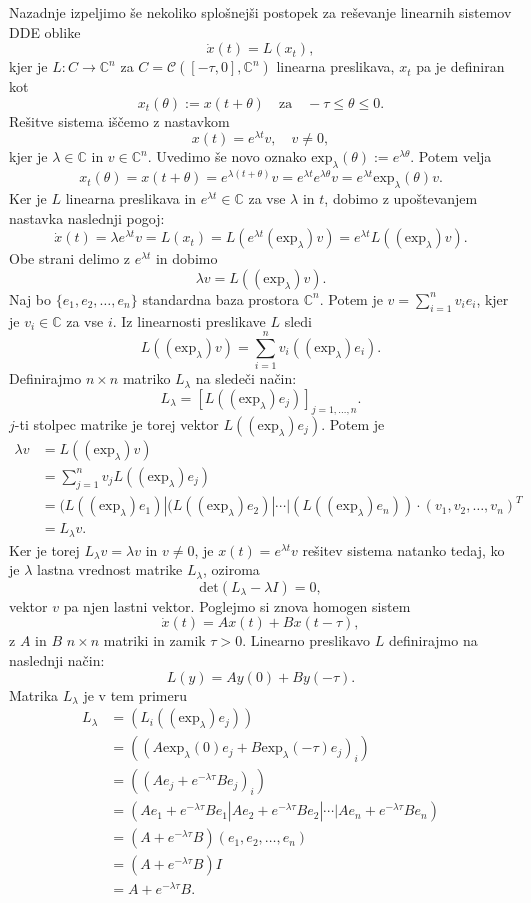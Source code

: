 \documentclass[12pt,a4paper]{amsart}
\theoremstyle{definition} %
\theoremstyle{plain} %
\newcommand{\C}{\mathbb C}
\newcommand{\okr}{\text{exp}_{\lambda}}
\begin{document}
Nazadnje izpeljimo še nekoliko splošnejši postopek za reševanje linearnih sistemov DDE oblike 
\[\dot{x}(t)=L(x_t),\]
kjer je $L:C\to\C^n$ za $C=\mathcal{C}([-\tau,0],\C^n)$ linearna preslikava, $x_t$ pa je definiran kot 
\[x_t(\theta):=x(t+\theta) \quad \text{za} \quad -\tau\leq\theta\leq0.\]
Rešitve sistema iščemo z nastavkom 
\[x(t)=e^{\lambda t}v, \quad v\neq0,\]
kjer je $\lambda\in\C$ in  $v\in\C^n$. Uvedimo še novo oznako $\text{exp}_{\lambda}(\theta):=e^{\lambda\theta}$.
Potem velja
\[x_t(\theta)=x(t+\theta)=e^{\lambda(t+\theta)}v=e^{\lambda t}e^{\lambda\theta}v=e^{\lambda t}\text{exp}_{\lambda}(\theta)v.\]
Ker je $L$ linearna preslikava in $e^{\lambda t}\in\C$ za vse $\lambda$ in $t$, dobimo z upoštevanjem nastavka naslednji
pogoj:
\[\dot{x}(t)=\lambda e^{\lambda t}v=L(x_t)=L(e^{\lambda t}(\text{exp}_{\lambda})v)=e^{\lambda t}L((\text{exp}_{\lambda})v).\]
Obe strani delimo z $e^{\lambda t}$ in dobimo 
\[ \lambda v=L((\okr)v).\]
Naj bo $\{e_1,e_2,\dots,e_n\}$ standardna baza prostora $\C^n$. Potem je 
$v=\sum_{i=1}^nv_ie_i$, kjer je $v_i\in\C$ za vse $i$. Iz linearnosti preslikave $L$ sledi 
\[L((\okr)v)=\sum_{i=1}^{n}v_i((\okr)e_i).\]
Definirajmo $n\times n$ matriko $L_\lambda$ na sledeči način:
\[ L_{\lambda}=[L((\okr)e_j)]_{j=1,\dots,n}.\]
$j$-ti stolpec matrike je torej vektor $L((\okr)e_j)$. Potem je
\begin{equation*}
    \begin{split}
        \lambda v &= L((\okr)v) \\
                &= \sum_{j=1}^{n}v_jL((\okr)e_j) \\
                &= (L((\okr)e_1)|(L((\okr)e_2)|\cdots|(L((\okr)e_n)) \cdot (v_1,v_2,\dots,v_n)^{T} \\
                &= L_{\lambda}v.
    \end{split}
\end{equation*}
Ker je torej $L_\lambda v =\lambda v$ in $v\neq0$, je $x(t)=e^{\lambda t}v$ rešitev sistema natanko tedaj, ko je
$\lambda$ lastna vrednost matrike $L_\lambda$, oziroma
\[ \text{det}(L_\lambda-\lambda I)=0,\]
vektor $v$ pa njen lastni vektor.
Poglejmo si znova homogen sistem 
\[ \dot{x}(t)=Ax(t)+Bx(t-\tau),\]
z $A$ in $B$ $n\times n$ matriki in zamik $\tau>0$. Linearno preslikavo $L$ definirajmo na naslednji način:
\[L(y)=Ay(0)+By(-\tau).\]
Matrika $L_\lambda$ je v tem primeru
\begin{equation*}
    \begin{split}
        L_\lambda &= (L_i((\okr)e_j)) \\
                &= ((A\okr(0)e_j+B\okr(-\tau)e_j)_i) \\
                &= ((Ae_j+e^{-\lambda\tau}Be_j)_i) \\
                &= (Ae_1+e^{-\lambda\tau}Be_1|Ae_2+e^{-\lambda\tau}Be_2|\cdots|Ae_n+e^{-\lambda\tau}Be_n) \\
                &= (A+e^{-\lambda\tau}B)(e_1,e_2,\dots,e_n) \\
                &= (A+e^{-\lambda\tau}B)I \\
                &= A+e^{-\lambda\tau}B.
    \end{split}
\end{equation*}
\end{document}
